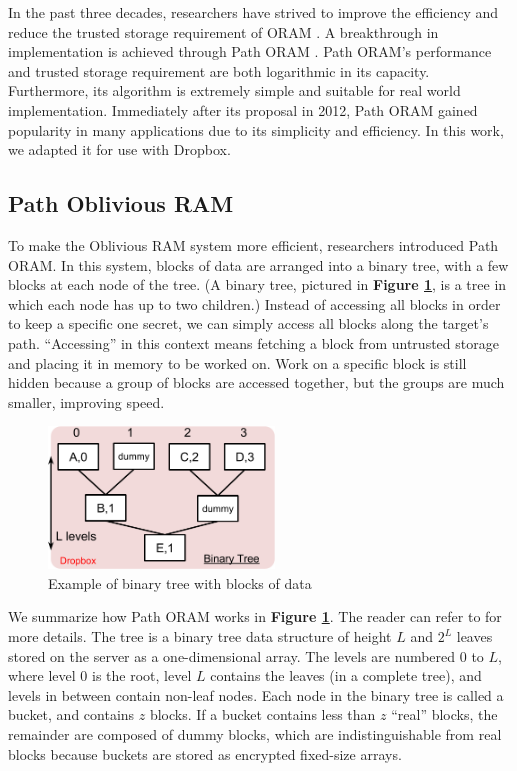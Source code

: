 \documentclass[conference]{IEEEtran}
\begin{document}
In the past three decades, researchers have strived to improve the efficiency and reduce the trusted storage requirement of ORAM \cite{G87, GM11, O90, SCSL11, SSS12}. A breakthrough in implementation is achieved through Path ORAM \cite{PathORAM}. Path ORAM’s performance and trusted storage requirement are both logarithmic in its capacity. Furthermore, its algorithm is extremely simple and suitable for real world implementation. Immediately after its proposal in 2012, Path ORAM gained popularity in many applications due to its simplicity and efficiency. In this work, we adapted it for use with Dropbox.

\subsection{Path Oblivious RAM}
To make the Oblivious RAM system more efficient, researchers introduced Path ORAM. In this system, blocks of data are arranged into a binary tree, with a few blocks at each node of the tree. (A binary tree, pictured in {\bf Figure \ref{fig:bintree}}, is a tree in which each node has up to two children.) Instead of accessing all blocks in order to keep a specific one secret, we can simply access all blocks along the target’s path. “Accessing” in this context means fetching a block from untrusted storage and placing it in memory to be worked on. Work on a specific block is still hidden because a group of blocks are accessed together, but the groups are much smaller, improving speed. 

\begin{figure}
\begin{center}
    \includegraphics[width=6cm]{220.png}
  \caption{Example of binary tree with blocks of data}
  \label{fig:bintree}
\end{center}
\end{figure}

We summarize how Path ORAM works in {\bf Figure \ref{fig:bintree}}. The reader can refer to \cite{PathORAM} for more details. The tree is a binary tree data structure of height $L$ and $2^L$ leaves stored on the server as a one-dimensional array. The levels are numbered 0 to $L$, where level 0 is the root, level $L$ contains the leaves (in a complete tree), and levels in between contain non-leaf nodes. Each node in the binary tree is called a bucket, and contains $z$ blocks. If a bucket contains less than $z$ “real” blocks, the remainder are composed of dummy blocks, which are indistinguishable from real blocks because buckets are stored as encrypted fixed-size arrays.
\end{document}
